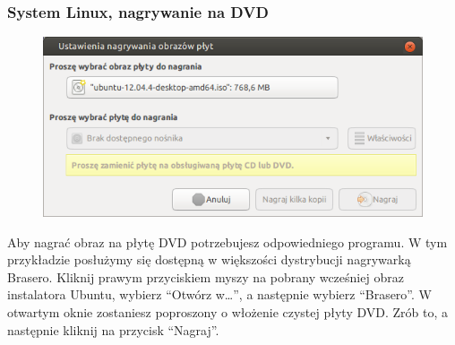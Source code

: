 \subsubsection{System Linux, nagrywanie na DVD}
\begin{figure}
                \includegraphics[width=\linewidth]{images/instalacja_nagrywanie_obrazu_linux_DVD.png}
\end{figure}
Aby nagrać obraz na płytę DVD potrzebujesz odpowiedniego programu. W tym przykładzie posłużymy się dostępną w większości dystrybucji nagrywarką Brasero. Kliknij prawym przyciskiem myszy na pobrany wcześniej obraz instalatora Ubuntu, wybierz “Otwórz w\ldots”, a następnie wybierz “Brasero”. W otwartym oknie zostaniesz poproszony o włożenie czystej płyty DVD. Zrób to, a następnie kliknij na przycisk “Nagraj”.
\clearpage
